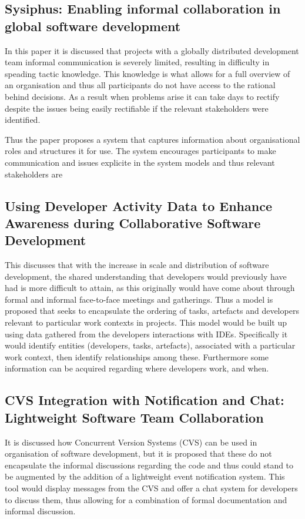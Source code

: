 \documentclass{l4proj}
\begin{document}
\subsection {Sysiphus: Enabling informal collaboration in global software development}

In this paper it is discussed that projects with a globally distributed development team informal communication is severely limited, resulting in difficulty in speading tactic knowledge.  This knowledge is what allows for a full overview of an organisation and thus all participants do not have access to the rational behind decisions.  As a result when problems arise it can take days to rectify despite the issues being easily rectifiable if the relevant stakeholders were identified.

Thus the paper proposes a system that captures information about organisational roles and structures it for use.  The system encourages participants to make communication and issues explicite in the system models and thus relevant stakeholders are

\subsection {Using Developer Activity Data to Enhance Awareness during Collaborative Software Development}

This discusses that with the increase in scale and distribution of software development, the shared understanding that developers would previously have had is more difficult to attain, as this originally would have come about through formal and informal face-to-face meetings and gatherings.  Thus a model is proposed that seeks to encapsulate the ordering of tasks, artefacts and developers relevant to particular work contexts in projects.  This model would be built up using data gathered from the developers interactions with IDEs.  Specifically it would identify entities (developers, tasks, artefacts), associated with a particular work context, then identify relationships among these. Furthermore some information can be acquired regarding where developers work, and when.

\subsection {CVS Integration with Notification and Chat: Lightweight Software Team Collaboration}

It is discussed how Concurrent Version Systems (CVS) can be used in organisation of software development, but it is proposed that these do not encapsulate the informal discussions regarding the code and thus could stand to be augmented by the addition of a lightweight event notification system.  This tool would display messages from the CVS and offer a chat system for developers to discuss them, thus allowing for a combination of formal documentation and informal discussion.
\end{document}
